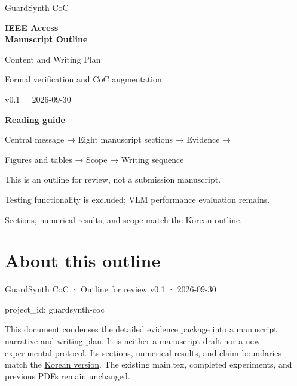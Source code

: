 \documentclass[11pt,a4paper]{article}
\begin{document}
\begin{titlepage}
\vspace*{20mm}
{\color{navy}\Large GuardSynth CoC\par}
\vspace{10mm}
{\huge\bfseries IEEE Access\\[4mm]Manuscript Outline\par}
\vspace{12mm}
{\Large Content and Writing Plan\par}
\vspace{6mm}
Formal verification and CoC augmentation\par
v0.1 · 2026-09-30\par
\vspace{12mm}
\textbf{Reading guide}\par
Central message → Eight manuscript sections → Evidence →\par
Figures and tables → Scope → Writing sequence\par
\vfill
This is an outline for review, not a submission manuscript.\par
Testing functionality is excluded; VLM performance evaluation remains.\par
Sections, numerical results, and scope match the Korean outline.\par
\end{titlepage}
\tableofcontents
\clearpage
\section*{About this outline}


GuardSynth CoC · Outline for review v0.1 · 2026-09-30\par

project\_\allowbreak{}id: {\ttfamily\small guardsynth-coc}\par

This document condenses the \href{\detokenize{../../../../../../projects/04-guardsynth-coc/paper/GUARDSYNTH_COC_METHODS_SETTINGS_PACKAGE_V01_KO.md}}{detailed evidence package} into a manuscript narrative and writing plan. It is neither a manuscript draft nor a new experimental protocol. Its sections, numerical results, and claim boundaries match the \href{\detokenize{../../../../../../projects/04-guardsynth-coc/paper/ieee-access/IEEE_ACCESS_MANUSCRIPT_OUTLINE_V01_KO.md}}{Korean version}. The existing main.tex, completed experiments, and previous PDFs remain unchanged.\par
\end{document}
